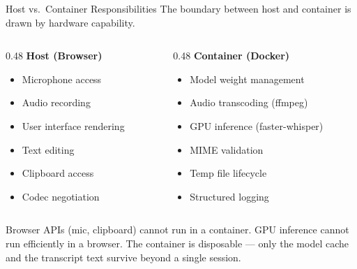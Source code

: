 \documentclass{beamer}
\begin{document}
\begin{frame}{Host vs.\ Container Responsibilities}
    \small
    The boundary between host and container is drawn by hardware capability.

    \vspace{0.3em}
    \begin{columns}[T]
        \begin{column}{0.48\textwidth}
            \textbf{Host (Browser)}
            \begin{itemize}\setlength{\itemsep}{0pt}
                \item Microphone access
                \item Audio recording
                \item User interface rendering
                \item Text editing
                \item Clipboard access
                \item Codec negotiation
            \end{itemize}
        \end{column}
        \begin{column}{0.48\textwidth}
            \textbf{Container (Docker)}
            \begin{itemize}\setlength{\itemsep}{0pt}
                \item Model weight management
                \item Audio transcoding (ffmpeg)
                \item GPU inference (faster-whisper)
                \item MIME validation
                \item Temp file lifecycle
                \item Structured logging
            \end{itemize}
        \end{column}
    \end{columns}

    \vspace{0.3em}
    Browser APIs (mic, clipboard) cannot run in a container.
    GPU inference cannot run efficiently in a browser.
    The container is disposable --- only the model cache
    and the transcript text survive beyond a single session.
\end{frame}
\end{document}
